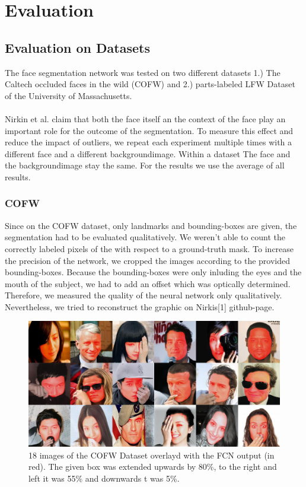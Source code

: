 \chapter{Evaluation}
\section{Evaluation on Datasets}
\label{sec:EvaluationOnDatasets} %
The face segmentation network was tested on two different datasets 1.) The Caltech occluded faces in the wild (COFW) and 2.) parts-labeled LFW Dataset of the University of Massachusetts.\\
\\
Nirkin et al. \cite{nirkin2018_faceswap} claim that both the face itself an the context of the face play an important role for the outcome of the segmentation. To measure this effect and reduce the impact of outliers, we repeat each experiment multiple times with a different face and a different backgroundimage. Within a dataset The face and the backgroundimage stay the same. For the results we use the average of all results.
\subsection{COFW}
Since on the COFW dataset, only landmarks and bounding-boxes are given, the segmentation had to be evaluated qualitatively. We weren't able to count the correctly labeled pixels of the with respect to a ground-truth mask. To increase the precision of the network, we cropped the images according to the provided bounding-boxes. Because the bounding-boxes were only inluding the eyes and the mouth of the subject, we had to add an offset which was optically determined. Therefore, we measured the quality of the neural network only qualitatively. Nevertheless, we tried to reconstruct the graphic on Nirkis[1] github-page.
\begin{figure}[h]
	\centering
	\includegraphics[width=.75\textwidth]{Figures/myMatrix.jpg}
	\caption{18 images of the COFW Dataset overlayd with the FCN output (in red). The given box was extended upwards by 80\%, to the right and left it was 55\% and downwards t was 5\%.}
	\label{figure2}
\end{figure}

